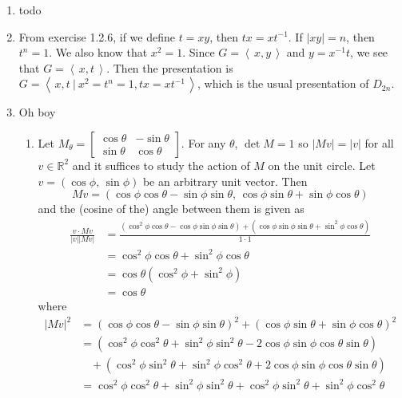 \documentclass[]{article}
\newcommand{\abs}[1]{\left\vert #1 \right\vert}
\newcommand{\bbr}{\mathbb{R}}
\begin{document}
\begin{enumerate}
\item {\color{red} todo}


\item From exercise 1.2.6, if we define $t = xy$, then $tx = xt^{-1}$. If $\abs{xy} = n$, then $t^n = 1$. We also know that $x^2 = 1$. Since $G = \left\langle\, x,y\, \right\rangle$ and $y = x^{-1}t$, we see that $G = \left\langle\,  x,t\,  \right\rangle$. Then the presentation is $G = \left\langle\,  x,t\ \vert\ x^2=t^n=1, tx=xt^{-1}\, \right\rangle$, which is the usual presentation of $D_{2n}$.


\item Oh boy
\begin{enumerate}
\item Let $M_\theta = \begin{bmatrix}\cos\theta & -\sin\theta \\ \sin\theta & \cos\theta\end{bmatrix}$. For any $\theta$, $\det M = 1$ so $\abs{Mv} = \abs{v}$ for all $v \in \bbr^2$ and it suffices to study the action of $M$ on the unit circle. Let $v = (\cos\phi,\, \sin\phi)$ be an arbitrary unit vector. Then 
\begin{equation}
Mv = (\cos\phi\cos\theta-\sin\phi\sin\theta,\, \cos\phi\sin\theta+\sin\phi\cos\theta)
\end{equation}
and the (cosine of the) angle between them is given as
\begin{align}
\frac{v \cdot Mv}{\abs{v}\abs{Mv}} &= \frac{\left( \cos^2\phi\cos\theta-\cos\phi\sin\phi\sin\theta \right) + \left( \cos\phi\sin\phi\sin\theta+\sin^2\phi\cos\theta \right)}{1\cdot 1} \\
&= \cos^2\phi\cos\theta + \sin^2\phi\cos\theta \\
&= \cos\theta\left(\cos^2\phi + \sin^2\phi\right) \\
&= \cos\theta
\end{align}
where
\begin{align}
\abs{Mv}^2 &= \left( \cos\phi\cos\theta-\sin\phi\sin\theta \right)^2 + \left( \cos\phi\sin\theta+\sin\phi\cos\theta \right)^2 \\
&= \left( \cos^2\phi\cos^2\theta + \sin^2\phi\sin^2\theta - 2\cos\phi\sin\phi\cos\theta\sin\theta \right) \nonumber \\
&\ \ \ \ + \left( \cos^2\phi\sin^2\theta+ \sin^2\phi\cos^2\theta + 2\cos\phi\sin\phi\cos\theta\sin\theta \right) \\
&= \cos^2\phi\cos^2\theta + \sin^2\phi\sin^2\theta + \cos^2\phi\sin^2\theta+ \sin^2\phi\cos^2\theta \\

\end{align}
\end{enumerate}
\end{enumerate}
\end{document}
